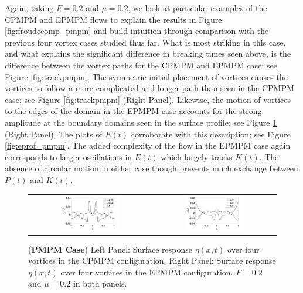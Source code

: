 \documentclass[a4paper,11pt]{article}
\begin{document}
Again, taking $F=0.2$ and $\mu=0.2$, we look at particular examples of the CPMPM and EPMPM flows to explain the results in Figure \ref{fig:froudecomp_pmpm} and build intuition through comparison with the previous four vortex cases studied thus far.  What is most striking in this case, and what explains the significant difference in breaking times seen above, is the difference between the vortex paths for the CPMPM and EPMPM case; see Figure \ref{fig:trackpmpm}.  The symmetric initial placement of vortices causes the vortices to follow a more complicated and longer path than seen in the CPMPM case; see Figure \ref{fig:trackpmpm} (Right Panel).  Likewise, the motion of vortices to the edges of the domain in the EPMPM case accounts for the strong amplitude at the boundary domains seen in the surface profile; see Figure \ref{fig:surfrepmpm} (Right Panel).  The plots of $E(t)$ corroborate with this description; see Figure \ref{fig:eprof_pmpm}.  The added complexity of the flow in the EPMPM case again corresponds to larger oscillations in $E(t)$ which largely tracks $K(t)$.  The absence of circular motion in either case though prevents much exchange between $P(t)$ and $K(t)$.  
\begin{figure}[!h]
\centering
\begin{tabular}{cc}
\includegraphics[width=0.5\textwidth]{surf_resp_mu_pt2_F_pt2_pmpm} & 
\includegraphics[width=0.5\textwidth]{surf_resp_mu_pt2_F_pt2_pmpm_sym}
\end{tabular}
\caption{\small ({\bf PMPM Case}) Left Panel: Surface response $\eta(x,t)$ over four vortices in the CPMPM configuration. Right Panel: Surface response $\eta(x,t)$ over four vortices in the EPMPM configuration.  $F=0.2$ and $\mu=0.2$ in both panels.}
\label{fig:surfrepmpm}
\end{figure}
\end{document}
